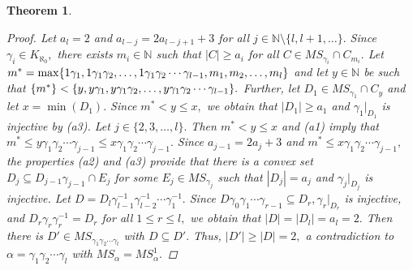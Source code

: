 \documentclass[11pt]{article}
\theoremstyle{plain}
\newtheorem{theorem}{Theorem}[section]
\theoremstyle{definition}
\begin{document}
\begin{theorem}
\begin{proof}
Let $a_{l}=2$ and $a_{l-j}=2a_{l-j+1}+3$ for all $j\in\mathbb{N}\setminus\{l,l+1,\ldots\}.$ Since $\gamma_{i}\in K_{\aleph_{0}},$ there exists $m_{i}\in\mathbb{N}$ such that $\left\vert C\right\vert\geq a_{i}$ for all $C\in MS_{\gamma_{i}}\cap C_{m_{i}}.$ Let $m^{*}=\max\{1\gamma_{1},1\gamma_{1}\gamma_{2},\linebreak\ldots,1\gamma_{1}\gamma_{2}\cdots\gamma_{l-1},m_{1},m_{2},\ldots,m_{l}\}$ and let $y\in\mathbb{N}$ be such that $\{m^{*}\}<\{y,y\gamma_{1},y\gamma_{1}\gamma_{2},\ldots,\linebreak y\gamma_{1}\gamma_{2}\cdots\gamma_{l-1}\}.$ Further, let $D_{1}\in MS_{\gamma_{1}}\cap C_{y}$ and let $x=\min(D_{1}).$ Since $m^{*}<y\leq x,$ we obtain that $\left\vert D_{1}\right\vert\geq a_{1}$ and $\gamma_{1}|_{D_{1}}$ is injective by (a3). Let $j\in\{2,3,\ldots,l\}.$ Then $m^{*}<y\leq x$ and (a1) imply that $m^{*}\leq y\gamma_{1}\gamma_{2}\cdots\gamma_{j-1}\leq x\gamma_{1}\gamma_{2}\cdots\gamma_{j-1}.$ Since $a_{j-1}=2a_{j}+3$ and $m^{*}\leq x\gamma_{1}\gamma_{2}\cdots\gamma_{j-1},$ the properties (a2) and (a3) provide that there is a convex set $D_{j}\subseteq D_{j-1}\gamma_{j-1}\cap E_{j}$ for some $E_{j}\in MS_{\gamma_{j}}$ such that $\left\vert D_{j}\right\vert=a_{j}$ and $\gamma_{j}|_{D_{j}}$ is injective. Let $D=D_{l}\gamma_{l-1}^{-1}\gamma_{l-2}^{-1}\cdots\gamma_{1}^{-1}.$ Since $D\gamma_{0}\gamma_{1}\cdots\gamma_{r-1}\subseteq D_{r},\gamma_{r}|_{D_{r}}$ is injective, and $D_{r}\gamma_{r}\gamma_{r}^{-1}=D_{r}$ for all $1\leq r\leq l,$ we obtain that $\left\vert D\right\vert=\left\vert D_{l}\right\vert=a_{l}=2.$ Then there is $D'\in MS_{\gamma_{1}\gamma_{2}\cdots\gamma_{l}}$ with $D\subseteq D'.$ Thus, $\left\vert D'\right\vert \geq \left\vert D\right\vert=2,$ a contradiction to $\alpha=\gamma_{1}\gamma_{2}\cdots\gamma_{l}$ with $MS_{\alpha}=MS_{\alpha}^{1}.$



\end{proof}
\end{theorem}
\end{document}
